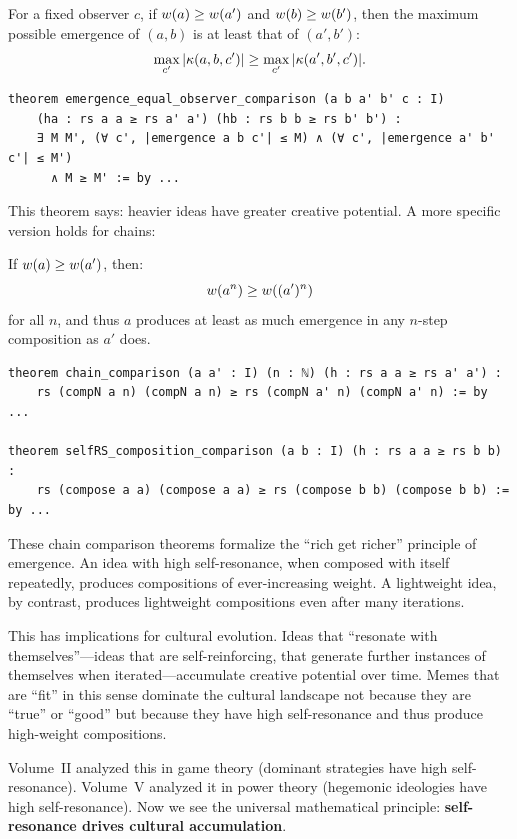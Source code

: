 \begin{theorem}
\label{thm:equal-observer}
For a fixed observer $c$, if $w(a) \geq w(a')$ and $w(b)
\geq w(b')$, then the maximum possible emergence of $(a,b)$ is at least
that of $(a',b')$:
\[
  \max_{c'} |\kappa(a, b, c')| \geq \max_{c'} |\kappa(a', b', c')|.
\]
\end{theorem}

\begin{lstlisting}[caption={Equal-observer comparison (IDT\_v3\_Emergence.lean)}]
theorem emergence_equal_observer_comparison (a b a' b' c : I)
    (ha : rs a a ≥ rs a' a') (hb : rs b b ≥ rs b' b') :
    ∃ M M', (∀ c', |emergence a b c'| ≤ M) ∧ (∀ c', |emergence a' b' c'| ≤ M')
      ∧ M ≥ M' := by ...
\end{lstlisting}

This theorem says: heavier ideas have greater creative potential. A more
specific version holds for chains:

\begin{theorem}
\label{thm:chain-comparison}
If $w(a) \geq w(a')$, then:
\[
  w(a^n) \geq w((a')^n)
\]
for all $n$, and thus $a$ produces at least as much emergence in any $n$-step
composition as $a'$ does.
\end{theorem}

\begin{lstlisting}[caption={Chain comparison (IDT\_v3\_Emergence.lean)}]
theorem chain_comparison (a a' : I) (n : ℕ) (h : rs a a ≥ rs a' a') :
    rs (compN a n) (compN a n) ≥ rs (compN a' n) (compN a' n) := by ...

theorem selfRS_composition_comparison (a b : I) (h : rs a a ≥ rs b b) :
    rs (compose a a) (compose a a) ≥ rs (compose b b) (compose b b) := by ...
\end{lstlisting}

\begin{interpretation}
These chain comparison theorems formalize the ``rich get richer'' principle
of emergence. An idea with high self-resonance, when composed with itself
repeatedly, produces compositions of ever-increasing weight. A lightweight
idea, by contrast, produces lightweight compositions even after many
iterations.

This has implications for cultural evolution. Ideas that ``resonate with
themselves''---ideas that are self-reinforcing, that generate further
instances of themselves when iterated---accumulate creative potential over
time. Memes that are ``fit'' in this sense dominate the cultural landscape
not because they are ``true'' or ``good'' but because they have high
self-resonance and thus produce high-weight compositions.

Volume~II analyzed this in game theory (dominant strategies have high
self-resonance). Volume~V analyzed it in power theory (hegemonic ideologies
have high self-resonance). Now we see the universal mathematical principle:
\textbf{self-resonance drives cultural accumulation}.
\end{interpretation}


